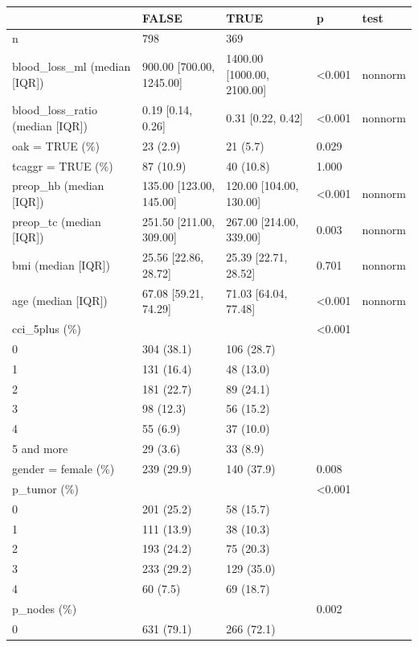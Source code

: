 \documentclass[
]{article}
\begin{document}
\begin{tabular}{l|l|l|l|l}
\hline
  & FALSE & TRUE & p & test\\
\hline
n & 798 & 369 &  & \\
\hline
blood\_loss\_ml (median [IQR]) & 900.00 [700.00, 1245.00] & 1400.00 [1000.00, 2100.00] & <0.001 & nonnorm\\
\hline
blood\_loss\_ratio (median [IQR]) & 0.19 [0.14, 0.26] & 0.31 [0.22, 0.42] & <0.001 & nonnorm\\
\hline
oak = TRUE (\%) & 23 (2.9) & 21 (5.7) & 0.029 & \\
\hline
tcaggr = TRUE (\%) & 87 (10.9) & 40 (10.8) & 1.000 & \\
\hline
preop\_hb (median [IQR]) & 135.00 [123.00, 145.00] & 120.00 [104.00, 130.00] & <0.001 & nonnorm\\
\hline
preop\_tc (median [IQR]) & 251.50 [211.00, 309.00] & 267.00 [214.00, 339.00] & 0.003 & nonnorm\\
\hline
bmi (median [IQR]) & 25.56 [22.86, 28.72] & 25.39 [22.71, 28.52] & 0.701 & nonnorm\\
\hline
age (median [IQR]) & 67.08 [59.21, 74.29] & 71.03 [64.04, 77.48] & <0.001 & nonnorm\\
\hline
cci\_5plus (\%) &  &  & <0.001 & \\
\hline
0 & 304 (38.1) & 106 (28.7) &  & \\
\hline
1 & 131 (16.4) & 48 (13.0) &  & \\
\hline
2 & 181 (22.7) & 89 (24.1) &  & \\
\hline
3 & 98 (12.3) & 56 (15.2) &  & \\
\hline
4 & 55 (6.9) & 37 (10.0) &  & \\
\hline
5 and more & 29 (3.6) & 33 (8.9) &  & \\
\hline
gender = female (\%) & 239 (29.9) & 140 (37.9) & 0.008 & \\
\hline
p\_tumor (\%) &  &  & <0.001 & \\
\hline
0 & 201 (25.2) & 58 (15.7) &  & \\
\hline
1 & 111 (13.9) & 38 (10.3) &  & \\
\hline
2 & 193 (24.2) & 75 (20.3) &  & \\
\hline
3 & 233 (29.2) & 129 (35.0) &  & \\
\hline
4 & 60 (7.5) & 69 (18.7) &  & \\
\hline
p\_nodes (\%) &  &  & 0.002 & \\
\hline
0 & 631 (79.1) & 266 (72.1) &  & \\

\end{tabular}
\end{document}
